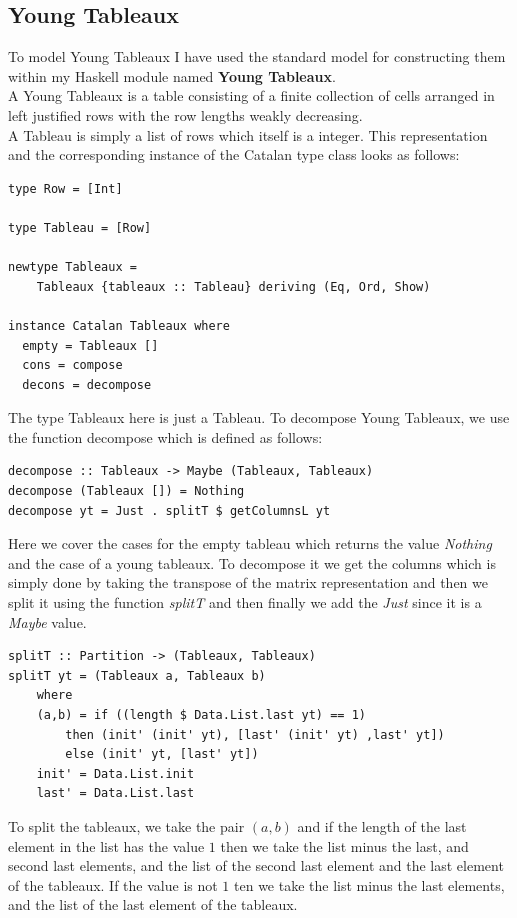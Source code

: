 \documentclass[12pt]{article}
\begin{document}
\subsection{Young Tableaux}
To model Young Tableaux I have used the standard model for constructing them within my Haskell module named {\bf Young Tableaux}.\\
A Young Tableaux is a table consisting of a finite collection of cells arranged in left justified rows with the row lengths weakly decreasing.\\
A Tableau is simply a list of rows which itself is a integer. This representation and the corresponding instance of the Catalan type class looks as follows:
\begin{lstlisting}
type Row = [Int]

type Tableau = [Row]

newtype Tableaux = 
	Tableaux {tableaux :: Tableau} deriving (Eq, Ord, Show)

instance Catalan Tableaux where
  empty = Tableaux []
  cons = compose
  decons = decompose
\end{lstlisting}
The type Tableaux here is just a Tableau. To decompose Young Tableaux, we use the function decompose which is defined as follows:
\begin{lstlisting}
decompose :: Tableaux -> Maybe (Tableaux, Tableaux)
decompose (Tableaux []) = Nothing
decompose yt = Just . splitT $ getColumnsL yt
\end{lstlisting}
Here we cover the cases for the empty tableau which returns the value {\it Nothing} and the case of a young tableaux. To decompose it we get the columns which is simply done by taking the transpose of the matrix representation and then we split it using the function {\it splitT} and then finally we add the {\it Just} since it is a {\it Maybe} value.
\begin{lstlisting}
splitT :: Partition -> (Tableaux, Tableaux)
splitT yt = (Tableaux a, Tableaux b)
	where
	(a,b) = if ((length $ Data.List.last yt) == 1)
		then (init' (init' yt), [last' (init' yt) ,last' yt])
		else (init' yt, [last' yt])	
	init' = Data.List.init
	last' = Data.List.last
\end{lstlisting}
To split the tableaux, we take the pair $(a, b)$ and if the length of the last element in the list has the value $1$ then we take the list minus the last, and second last elements, and the list of the second last element and the last element of the tableaux. If the value is not $1$ ten we take the list minus the last elements, and the list of the last element of the tableaux.
\end{document}
